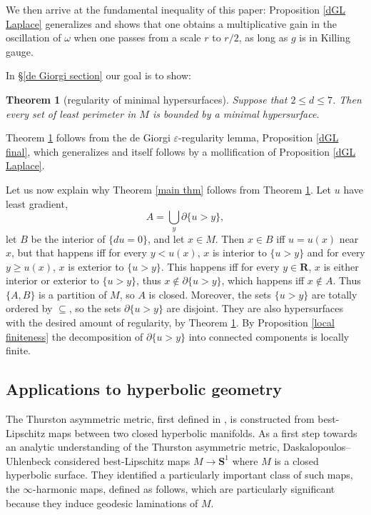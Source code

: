 \documentclass[reqno,12pt,letterpaper]{amsart}
\newcommand{\RR}{\mathbf{R}}
\newcommand{\Sph}{\mathbf S}
\newtheorem{theorem}{Theorem}[section]
\theoremstyle{definition}
\numberwithin{equation}{section}
\begin{document}
We then arrive at the fundamental inequality of this paper: Proposition \ref{dGL Laplace} generalizes \cite[Teorema 4.3]{Miranda66} and shows that one obtains a multiplicative gain in the oscillation of $\omega$ when one passes from a scale $r$ to $r/2$, as long as $g$ is in Killing gauge.

In \S\ref{de Giorgi section} our goal is to show:

\begin{theorem}[regularity of minimal hypersurfaces]\label{main lma}
Suppose that $2 \leq d \leq 7$.
Then every set of least perimeter in $M$ is bounded by a minimal hypersurface.
\end{theorem}

Theorem \ref{main lma} follows from the de Giorgi $\varepsilon$-regularity lemma, Proposition \ref{dGL final}, which generalizes \cite[Teorema 5.7]{Miranda66} and itself follows by a mollification of Proposition \ref{dGL Laplace}.

Let us now explain why Theorem \ref{main thm} follows from Theorem \ref{main lma}.
Let $u$ have least gradient,
\begin{equation}\label{lamination union}
A = \bigcup_y \partial \{u > y\},
\end{equation}
let $B$ be the interior of $\{du = 0\}$, and let $x \in M$.
Then $x \in B$ iff $u = u(x)$ near $x$, but that happens iff for every $y < u(x)$, $x$ is interior to $\{u > y\}$ and for every $y \geq u(x)$, $x$ is exterior to $\{u > y\}$.
This happens iff for every $y \in \RR$, $x$ is either interior or exterior to $\{u > y\}$, thus $x \notin \partial \{u > y\}$, which happens iff $x \notin A$.
Thus $\{A, B\}$ is a partition of $M$, so $A$ is closed.
Moreover, the sets $\{u > y\}$ are totally ordered by $\subseteq$, so the sets $\partial \{u > y\}$ are disjoint.
They are also hypersurfaces with the desired amount of regularity, by Theorem \ref{main lma}.
By Proposition \ref{local finiteness} the decomposition of $\partial \{u > y\}$ into connected components is locally finite.


\subsection{Applications to hyperbolic geometry}
The Thurston asymmetric metric, first defined in \cite{thurston1998minimal}, is constructed from best-Lipschitz maps between two closed hyperbolic manifolds.
As a first step towards an analytic understanding of the Thurston asymmetric metric, Daskalopoulos--Uhlenbeck \cite{daskalopoulos2020transverse} considered best-Lipschitz maps $M \to \Sph^1$ where $M$ is a closed hyperbolic surface.
They identified a particularly important class of such maps, the $\infty$-harmonic maps, defined as follows, which are particularly significant because they induce geodesic laminations of $M$.
\end{document}
